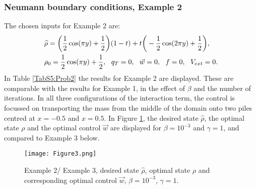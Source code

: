 
\subsubsection{Neumann boundary conditions, Example 2} 
The chosen inputs for Example 2 are:
\begin{align*}
&\widehat \rho = \bigg(\frac{1}{2}\cos(\pi y) + \frac{1}{2}\bigg)(1-t) + t\bigg(-\frac{1}{2}\cos(2 \pi y) + \frac{1}{2}\bigg),\\
&\rho_{0} = \frac{1}{2}\cos(\pi y) + \frac{1}{2},\ \
q_{T} = 0,\ \
\vec{w} = 0,\ \
f =0,\ \
V_{ext} =0.
\end{align*}
In Table \ref{TabS5:Prob2} the results for Example 2 are displayed. These are comparable with the results for Example 1, in the effect of $\beta$ and the number of iterations. In all three configurations of the interaction term, the control is focussed on transporting the mass from the middle of the domain onto two piles centred at $x=-0.5$ and $x=0.5$. In Figure \ref{Ex22DN1}, the desired state $\widehat \rho$, the optimal state $\rho$ and the optimal control $\vec{w}$ are displayed for $\beta = 10^{-3}$ and $\gamma = 1$, and compared to Example 3 below. 
\begin{figure}[h]
	\texttt{[image: Figure3.png]}
	\caption{Example 2/ Example 3, desired state $\widehat \rho$, optimal state $\rho$ and corresponding optimal control $\vec{w}$, $\beta = 10^{-3}$, $\gamma = 1$.}
	\label{Ex22DN1}
\end{figure}

